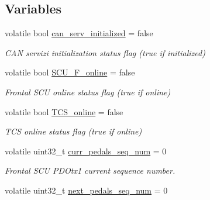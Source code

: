 \subsection*{Variables}
\begin{DoxyCompactItemize}
\item 
\hypertarget{group___c_a_n__servizi__group_gaf351ebc02b2d28174f8e4b18ff9edf5f}{volatile bool \hyperlink{group___c_a_n__servizi__group_gaf351ebc02b2d28174f8e4b18ff9edf5f}{can\-\_\-serv\-\_\-initialized} = false}\label{group___c_a_n__servizi__group_gaf351ebc02b2d28174f8e4b18ff9edf5f}

\begin{DoxyCompactList}\small\item\em C\-A\-N servizi initialization status flag (true if initialized) \end{DoxyCompactList}\item 
\hypertarget{group___c_a_n__servizi__group_gafc26efcf97051372e70a8d0f2f0c79f0}{volatile bool \hyperlink{group___c_a_n__servizi__group_gafc26efcf97051372e70a8d0f2f0c79f0}{S\-C\-U\-\_\-\-F\-\_\-online} = false}\label{group___c_a_n__servizi__group_gafc26efcf97051372e70a8d0f2f0c79f0}

\begin{DoxyCompactList}\small\item\em Frontal S\-C\-U online status flag (true if online) \end{DoxyCompactList}\item 
\hypertarget{group___c_a_n__servizi__group_gad3e88db55b4105026b7e451f853a796b}{volatile bool \hyperlink{group___c_a_n__servizi__group_gad3e88db55b4105026b7e451f853a796b}{T\-C\-S\-\_\-online} = false}\label{group___c_a_n__servizi__group_gad3e88db55b4105026b7e451f853a796b}

\begin{DoxyCompactList}\small\item\em T\-C\-S online status flag (true if online) \end{DoxyCompactList}\item 
\hypertarget{group___c_a_n__servizi__group_gacad002b7cb06bffa8811859e6f53cb28}{volatile uint32\-\_\-t \hyperlink{group___c_a_n__servizi__group_gacad002b7cb06bffa8811859e6f53cb28}{curr\-\_\-pedals\-\_\-seq\-\_\-num} = 0}\label{group___c_a_n__servizi__group_gacad002b7cb06bffa8811859e6f53cb28}

\begin{DoxyCompactList}\small\item\em Frontal S\-C\-U P\-D\-Otx1 current sequence number. \end{DoxyCompactList}\item 
\hypertarget{group___c_a_n__servizi__group_gadcbd4ad67b50cf61731266bf5c5ba158}{volatile uint32\-\_\-t \hyperlink{group___c_a_n__servizi__group_gadcbd4ad67b50cf61731266bf5c5ba158}{next\-\_\-pedals\-\_\-seq\-\_\-num} = 0}\label{group___c_a_n__servizi__group_gadcbd4ad67b50cf61731266bf5c5ba158}


\end{DoxyCompactItemize}
